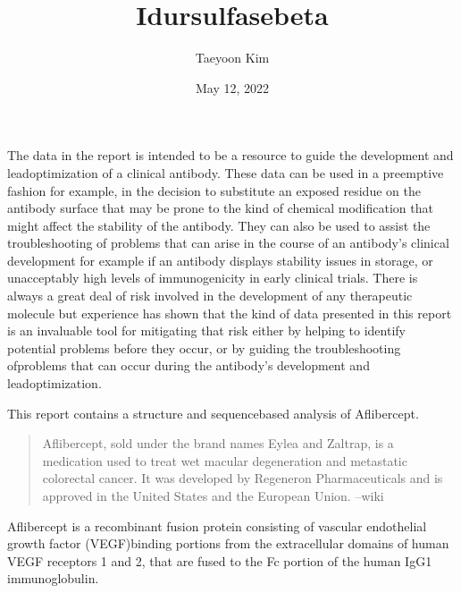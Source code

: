 \documentclass[letterpaper,10pt,english]{jupyterBook}
\title{Idursulfasebeta}
\date{May 12, 2022}
\author{Taeyoon Kim}
\begin{document}
\pagestyle{empty}
\sphinxmaketitle
\pagestyle{plain}
\sphinxtableofcontents
\pagestyle{normal}
\label{\detokenize{intro::doc}}


\sphinxAtStartPar
The data in the report is intended to be a resource to guide the development and lead\sphinxhyphen{}optimization of a clinical antibody. These data can be used in a preemptive fashion \sphinxhyphen{} for example, in the decision to substitute an exposed residue on the antibody surface that may be prone to the kind of chemical modification that might affect the stability of the antibody. They can also be used to assist the troubleshooting of problems that can arise in the course of an antibody’s clinical development \sphinxhyphen{} for example if an antibody displays stability issues in storage, or unacceptably high levels of immunogenicity in early clinical trials. There is always a great deal of risk involved in the development of any therapeutic molecule but experience has shown that the kind of data presented in this report is an invaluable tool for mitigating that risk \sphinxhyphen{} either by helping to identify potential problems before they occur, or by guiding the troubleshooting ofproblems that can occur during the antibody’s development and lead\sphinxhyphen{}optimization.

\begin{DUlineblock}{0em}
\item[] 
\end{DUlineblock}

\sphinxAtStartPar
This report contains a structure and sequence\sphinxhyphen{}based analysis of Aflibercept.
\begin{quote}

\sphinxAtStartPar
Aflibercept, sold under the brand names Eylea and Zaltrap, is a medication used to treat wet macular degeneration and metastatic colorectal cancer. It was developed by Regeneron Pharmaceuticals and is approved in the United States and the European Union. –wiki
\end{quote}

\sphinxAtStartPar
Aflibercept is a recombinant fusion protein consisting of vascular endothelial growth factor (VEGF)\sphinxhyphen{}binding portions from the extracellular domains of human VEGF receptors 1 and 2, that are fused to the Fc portion of the human IgG1 immunoglobulin.

\begin{DUlineblock}{0em}
\item[] 
\end{DUlineblock}
\end{document}
